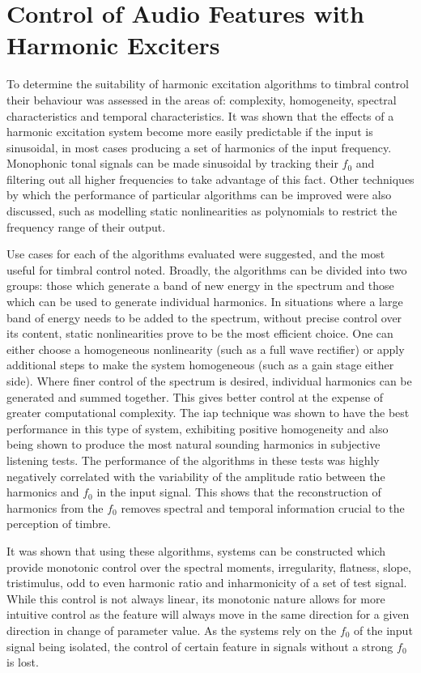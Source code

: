 \section{Control of Audio Features with Harmonic Exciters}
\label{sec:Conclusion-FeatureConrol}
	To determine the suitability of harmonic excitation algorithms to timbral control their behaviour was assessed in
	the areas of: complexity, homogeneity, spectral characteristics and temporal characteristics. It was shown that the
	effects of a harmonic excitation system become more easily predictable if the input is sinusoidal, in most cases
	producing a set of harmonics of the input frequency. Monophonic tonal signals can be made sinusoidal by tracking
	their $f_{0}$ and filtering out all higher frequencies to take advantage of this fact. Other techniques by which the
	performance of particular algorithms can be improved were also discussed, such as modelling static nonlinearities as
	polynomials to restrict the frequency range of their output.
	
	Use cases for each of the algorithms evaluated were suggested, and the most useful for timbral control noted.
	Broadly, the algorithms can be divided into two groups: those which generate a band of new energy in the spectrum
	and those which can be used to generate individual harmonics. In situations where a large band of energy needs to be
	added to the spectrum, without precise control over its content, static nonlinearities prove to be the most
	efficient choice. One can either choose a homogeneous nonlinearity (such as a full wave rectifier) or apply
	additional steps to make the system homogeneous (such as a gain stage either side). Where finer control of the
	spectrum is desired, individual harmonics can be generated and summed together. This gives better control at the
	expense of greater computational complexity. The \acrshort{iap} technique was shown to have the best performance in
	this type of system, exhibiting positive homogeneity and also being shown to produce the most natural sounding
	harmonics in subjective listening tests. The performance of the algorithms in these tests was highly negatively
	correlated with the variability of the amplitude ratio between the harmonics and $f_{0}$ in the input signal. This
	shows that the reconstruction of harmonics from the $f_{0}$ removes spectral and temporal information crucial to the
	perception of timbre.

	It was shown that using these algorithms, systems can be constructed which provide monotonic control over the
	spectral moments, irregularity, flatness, slope, tristimulus, odd to even harmonic ratio and inharmonicity of a set
	of test signal. While this control is not always linear, its monotonic nature allows for more intuitive control as
	the feature will always move in the same direction for a given direction in change of parameter value. As the
	systems rely on the $f_{0}$ of the input signal being isolated, the control of certain feature in signals without a
	strong $f_{0}$ is lost. 

